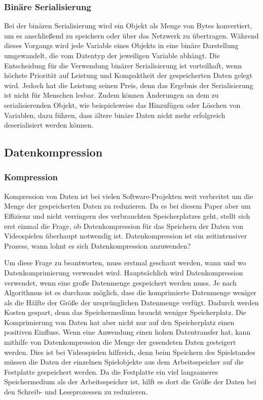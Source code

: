 \subsubsection{Binäre Serialisierung}
Bei der binären Serialisierung wird ein Objekt als Menge von Bytes konvertiert, um es anschließend zu speichern oder über das Netzwerk zu übertragen. Während dieses Vorgangs wird jede Variable eines Objekts in eine binäre Darstellung umgewandelt, die vom Datentyp der jeweiligen Variable abhängt. Die Entscheidung für die Verwendung binärer Serialisierung ist vorteilhaft, wenn höchste Priorität auf Leistung und Kompaktheit der gespeicherten Daten gelegt wird. Jedoch hat die Leistung seinen Preis, denn das Ergebnis der Serialisierung ist nicht für Menschen lesbar. Zudem können Änderungen an dem zu serialisierenden Objekt, wie beispielsweise das Hinzufügen oder Löschen von Variablen, dazu führen, dass ältere binäre Daten nicht mehr erfolgreich deserialisiert werden können.
\cite{microsoftBinarySerialization}\cite{programmathicallyUnderstandingBinary}


\subsection{Datenkompression}
\subsubsection{Kompression}
Kompression von Daten ist bei vielen Software-Projekten weit verbreitet um die Menge der gespeicherten Daten zu reduzieren. Da es bei diesem Paper aber um Effizienz und nicht verringern des verbrauchten Speicherplatzes geht, stellt sich erst einmal die Frage, ob Datenkompression für das Speichern der Daten von Videospielen überhaupt notwendig ist. Datenkompression ist ein zeitintensiver Prozess, wann lohnt es sich Datenkompression anzuwenden? 

Um diese Frage zu beantworten, muss erstmal geschaut werden, wann und wo Datenkomprimierung verwendet wird. Hauptsächlich wird Datenkompression verwendet, wenn eine große Datenmenge gespeichert werden muss. Je nach Algorithmus ist es durchaus möglich, dass die komprimierte Datenmenge weniger als die Hälfte der Größe der ursprünglichen Datenmenge verfügt. Dadurch werden Kosten gespart, denn das Speichermedium braucht weniger Speicherplatz. Die Komprimierung von Daten hat aber nicht nur auf den Speicherplatz einen positiven Einfluss. Wenn eine Anwendung einen hohen Datentransfer hat, kann mithilfe von Datenkompression die Menge der gesendeten Daten gesteigert werden. Dies ist bei Videospielen hilfreich, denn beim Speichern des Spielstandes müssen die Daten der einzelnen Spielobjekte aus dem Arbeitsspeicher auf die Festplatte gespeichert werden. Da die Festplatte ein viel langsameres Speichermedium als der Arbeitsspeicher ist, hilft es dort die Größe der Daten bei den Schreib- und Leseprozessen zu reduzieren. 
\cite{mediumWhenDataCompression}

